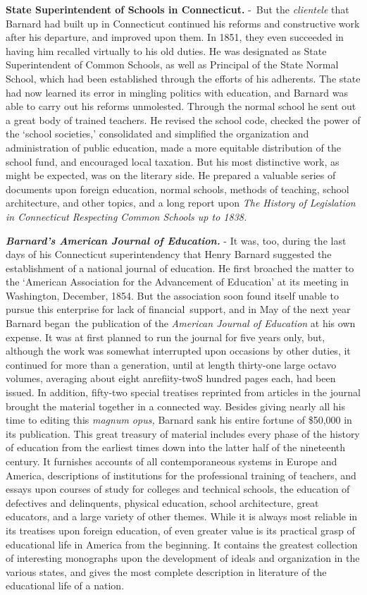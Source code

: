 \documentclass[
]{book}
\begin{document}
\textbf{State Superintendent of Schools in Connecticut.} -~But the \emph{clientele} that Barnard had built up in Connecticut continued his reforms and constructive work after his departure, and improved upon them. In 1851, they even succeeded in having him recalled virtually to his old duties. He was designated as State Superintendent of Common Schools, as well as Principal of the State Normal School, which had been established through the efforts of his adherents. The state had now learned its error in mingling politics with education, and Barnard was able to carry out his reforms unmolested. Through the normal school he sent out a great body of trained teachers. He revised the school code, checked the power of the `school societies,' consolidated and simplified the organization and administration of public education, made a more equitable distribution of the school fund, and encouraged local taxation. But his most distinctive work, as might be expected, was on the literary side. He prepared a valuable series of documents upon foreign education, normal schools, methods of teaching, school architecture, and other topics, and a long report upon \emph{The History of Legislation in Connecticut Respecting Common Schools up to 1838.}

\textbf{\emph{Barnard's American Journal of Education.}} - It was, too, during the last days of his Connecticut superintendency that Henry Barnard suggested the establishment of a national journal of education. He first broached the matter to the `American Association for the Advancement of Education' at its meeting in Washington, December, 1854. But the association soon found itself unable to pursue this enterprise for lack of financial~support, and in May of the next year Barnard began~the publication of the \emph{American Journal of Education} at his own expense. It was at first planned to run the journal for five years only, but, although the work was somewhat interrupted upon occasions by other duties, it continued for more than a generation, until at length thirty-one large octavo volumes, averaging about eight anr\textbar efiity-twoS hundred pages each, had been issued. In addition, fifty-two special treatises reprinted from articles in the journal brought the material together in a connected way. Besides giving nearly all his time to editing this \emph{magnum opus,} Barnard sank his entire fortune of \$50,000 in its publication. This great treasury of material includes every phase of the history of education from the earliest times down into the latter half of the nineteenth century. It furnishes accounts of all contemporaneous systems in Europe and America, descriptions of institutions for the professional training of teachers, and essays upon courses of study for colleges and technical schools, the education of defectives and delinquents, physical education, school architecture, great educators, and a large variety of other themes. While it is always most reliable in its treatises upon foreign education, of even greater value is its practical grasp of educational life in America from the beginning. It contains the greatest collection of interesting monographs upon the development of ideals and organization in the various states, and gives the most complete description in literature of the educational life of a nation.
\end{document}
